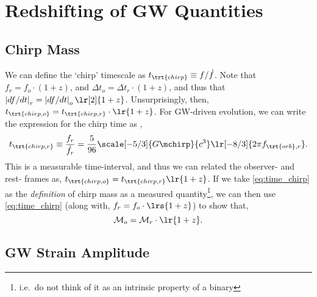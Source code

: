 \documentclass[10pt, oneside, onecolumn]{article}   	%
\newcommand{\frstorb}{f_{\trt{orb},r}}
\begin{document}
    \appendix

    \section{Redshifting of GW Quantities}
    \label{sec:app_redshift}

        \subsection{Chirp Mass}

            We can define the `chirp' timescale as $t_\trt{chirp} \equiv f / \dot{f}$.  Note that $f_r = f_o \cdot (1+z)$, and $\Delta t_o = \Delta t_r \cdot (1+z)$, and thus that $\left| df / dt \right|_r = \left| df / dt \right|_o \lr[2]{1+z}$.  Unsurprisingly, then, $t_\trt{chirp,o} = t_\trt{chirp,r} \cdot \lr{1+z}$.  For GW-driven evolution, we can write the expression for the chirp time as \citep[][Eq.3]{DOrazio+Loeb-2021},
            \begin{equation}
                \label{eq:time_chirp}
                t_\trt{chirp,r} \equiv \frac{f_r}{\dot{f_r}} = \frac{5}{96} \scale[-5/3]{G \mchirp}{c^3} \lr[-8/3]{2\pi \frstorb}.
            \end{equation}
            This is a measurable time-interval, and thus we can related the observer- and rest- frames as, $t_\trt{chirp,o} = t_\trt{chirp,r} \lr{1+z}$.  If we take \eqref{eq:time_chirp} as the \textit{definition} of chirp mass as a measured quantity\footnote{i.e.~do not think of it as an intrinsic property of a binary}, we can then use \eqref{eq:time_chirp} (along with, $f_r = f_o \cdot \lrs{1+z}$) to show that,
            \begin{equation}
                \label{eq:mchirp_redshift}
                \mathcal{M}_o = \mathcal{M}_r \cdot \lr{1+z}.
            \end{equation}

        \subsection{GW Strain Amplitude}
\end{document}
